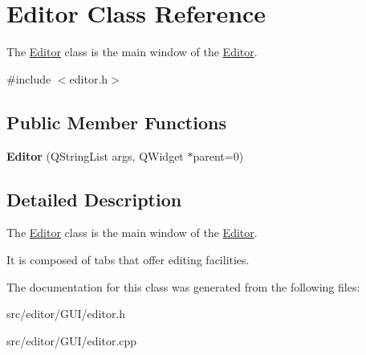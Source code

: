 \hypertarget{class_editor}{\section{\-Editor \-Class \-Reference}
\label{class_editor}
}


\-The \hyperlink{class_editor}{\-Editor} class is the main window of the \hyperlink{class_editor}{\-Editor}.  




{\ttfamily \#include $<$editor.\-h$>$}

\subsection*{\-Public \-Member \-Functions}
\begin{DoxyCompactItemize}
\item 
\hypertarget{class_editor_a7332320d22be46fb91bf0471dac0279b}{{\bfseries \-Editor} (\-Q\-String\-List args, \-Q\-Widget $\ast$parent=0)}\label{class_editor_a7332320d22be46fb91bf0471dac0279b}

\end{DoxyCompactItemize}


\subsection{\-Detailed \-Description}
\-The \hyperlink{class_editor}{\-Editor} class is the main window of the \hyperlink{class_editor}{\-Editor}. 

\-It is composed of tabs that offer editing facilities. 

\-The documentation for this class was generated from the following files\-:\begin{DoxyCompactItemize}
\item 
src/editor/\-G\-U\-I/editor.\-h\item 
src/editor/\-G\-U\-I/editor.\-cpp\end{DoxyCompactItemize}
